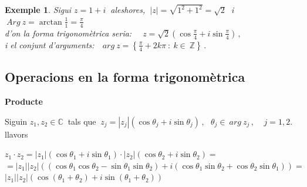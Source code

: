 \documentclass[12pt]{article}
\newtheorem{exemple}{Exemple}[subsection]
\newcommand{\C}{\mathbb{C}}
\begin{document}
\vspace{0.4cm}
\begin{exemple}   Sigui $z=1+i\ $ aleshores, $\
|z|=\sqrt{1^{2}+1^{2}}=\sqrt2\ $ i
$\displaystyle\ Arg\ z=\arctan\frac{1}{1}=\frac{\pi}{4}$\\

d'on la forma trigonom{\`e}trica seria: $\displaystyle\quad
z=\sqrt2\left(\cos\frac{\pi}{4}+i\sin\frac{\pi}{4}\right)\,,$\\

i el conjunt d'arguments:$\quad arg\ z=\left\{\displaystyle\frac{\pi}{4}+2k\pi\ :\ k\in\ \mathbb{Z}\right\}\,.$\\
\end{exemple}

\begin{figure}[h!]
\begin{center}
\vspace{-.4cm}
\end{center}
\end{figure}



\vspace{0.5cm}


\subsection{Operacions en la forma trigonom{\`e}trica}

\begin{center}
\textbf{Producte}
\end{center}


Siguin $z_{1},z_{2}\in \C\ $ tals que $\
z_{j}=|z_j|(\cos\theta_j+i\sin\theta_j)\,,\ \  \ \theta_j\in\
arg\ z_j\,,\ \ \ \ \ j=1,2.$\\

llavors\

\hspace{1.5cm}$z_1\cdot z_2=|z_1|(\cos\theta_1+i\sin\theta_1)\cdot
|z_2|(\cos\theta_2+i\sin\theta_2)=$\\

\hspace{1.5cm}$=
|z_1||z_2|((\cos\theta_1\cos\theta_2-\sin\theta_1\sin\theta_2)+i(\cos\theta_1\sin\theta_2+\cos\theta_2\sin\theta_1))=$\\

\hspace{1.5cm}$|z_1||z_2|(\cos(\theta_1+\theta_2)+i\sin(\theta_1+\theta_2))$\\
\end{document}
